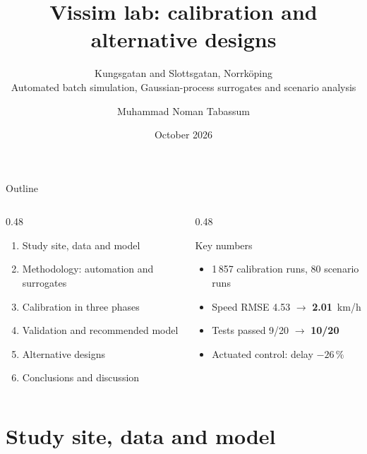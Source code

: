 \documentclass[aspectratio=169,10pt]{beamer}
\title{Vissim lab: calibration and alternative designs}
\subtitle{Kungsgatan and Slottsgatan, Norrk\"oping\\[2pt]
\small Automated batch simulation, Gaussian-process surrogates and scenario analysis}
\author{Muhammad Noman Tabassum}
\institute{Infra Informatics PhD course, Simulation module}
\date{October 2026}
\newcommand{\hl}[1]{\textcolor{accent}{\textbf{#1}}}
\begin{document}

\begin{frame}[plain]
\titlepage
\end{frame}

\begin{frame}{Outline}
\begin{columns}[T]
\begin{column}{0.48\textwidth}
\begin{enumerate}\setlength{\itemsep}{6pt}
  \item Study site, data and model
  \item Methodology: automation and surrogates
  \item Calibration in three phases
  \item Validation and recommended model
  \item Alternative designs
  \item Conclusions and discussion
\end{enumerate}
\end{column}
\begin{column}{0.48\textwidth}
\begin{block}{Key numbers}
\small
\begin{itemize}
  \item 1\,857 calibration runs, 80 scenario runs
  \item Speed RMSE 4.53 $\rightarrow$ \hl{2.01}~km/h
  \item Tests passed 9/20 $\rightarrow$ \hl{10/20}
  \item Actuated control: delay \hl{$-26\,\%$}
\end{itemize}
\end{block}
\end{column}
\end{columns}
\end{frame}

\section{Study site, data and model}
\end{document}
